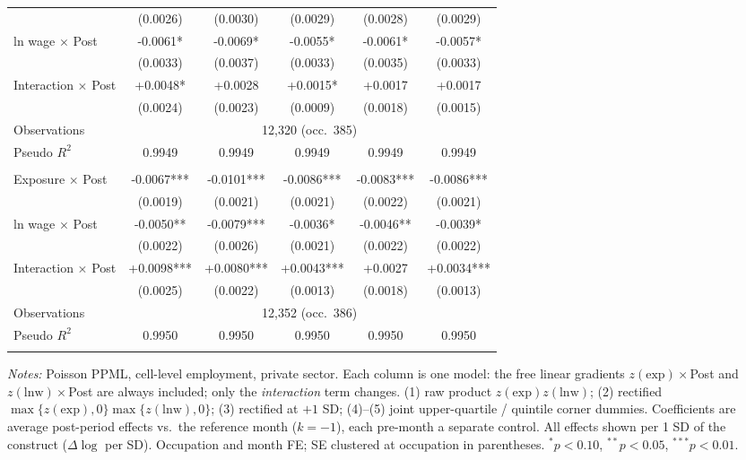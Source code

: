 \begin{table}[H]
\begin{tabular}{lccccc}
 & (0.0026) & (0.0030) & (0.0029) & (0.0028) & (0.0029) \\
ln wage $\times$ Post & -0.0061* & -0.0069* & -0.0055* & -0.0061* & -0.0057* \\
 & (0.0033) & (0.0037) & (0.0033) & (0.0035) & (0.0033) \\
Interaction $\times$ Post & +0.0048* & +0.0028 & +0.0015* & +0.0017 & +0.0017 \\
 & (0.0024) & (0.0023) & (0.0009) & (0.0018) & (0.0015) \\
\quad Observations & \multicolumn{5}{c}{12,320 \quad (occ.\ 385)} \\
\quad Pseudo $R^2$ & 0.9949 & 0.9949 & 0.9949 & 0.9949 & 0.9949 \\
\addlinespace
\multicolumn{6}{@{}l}{\textit{Panel: ages 51–60}} \\
Exposure $\times$ Post & -0.0067*** & -0.0101*** & -0.0086*** & -0.0083*** & -0.0086*** \\
 & (0.0019) & (0.0021) & (0.0021) & (0.0022) & (0.0021) \\
ln wage $\times$ Post & -0.0050** & -0.0079*** & -0.0036* & -0.0046** & -0.0039* \\
 & (0.0022) & (0.0026) & (0.0021) & (0.0022) & (0.0022) \\
Interaction $\times$ Post & +0.0098*** & +0.0080*** & +0.0043*** & +0.0027 & +0.0034*** \\
 & (0.0025) & (0.0022) & (0.0013) & (0.0018) & (0.0013) \\
\quad Observations & \multicolumn{5}{c}{12,352 \quad (occ.\ 386)} \\
\quad Pseudo $R^2$ & 0.9950 & 0.9950 & 0.9950 & 0.9950 & 0.9950 \\
\addlinespace
\bottomrule
\end{tabular}
\begin{minipage}{\linewidth}\vspace{2pt}\footnotesize
\emph{Notes:} Poisson PPML, cell-level employment, private sector. Each column is one model: the free linear gradients $z(\text{exp})\times$Post and $z(\text{lnw})\times$Post are always included; only the \emph{interaction} term changes. (1) raw product $z(\text{exp})z(\text{lnw})$; (2) rectified $\max\{z(\text{exp}),0\}\max\{z(\text{lnw}),0\}$; (3) rectified at $+1$ SD; (4)--(5) joint upper-quartile / quintile corner dummies. Coefficients are average post-period effects vs.\ the reference month ($k{=}{-}1$), each pre-month a separate control. All effects shown per 1 SD of the construct ($\Delta\log$ per SD). Occupation and month FE; SE clustered at occupation in parentheses. $^{*}p<0.10$, $^{**}p<0.05$, $^{***}p<0.01$.
\end{minipage}
\end{table}